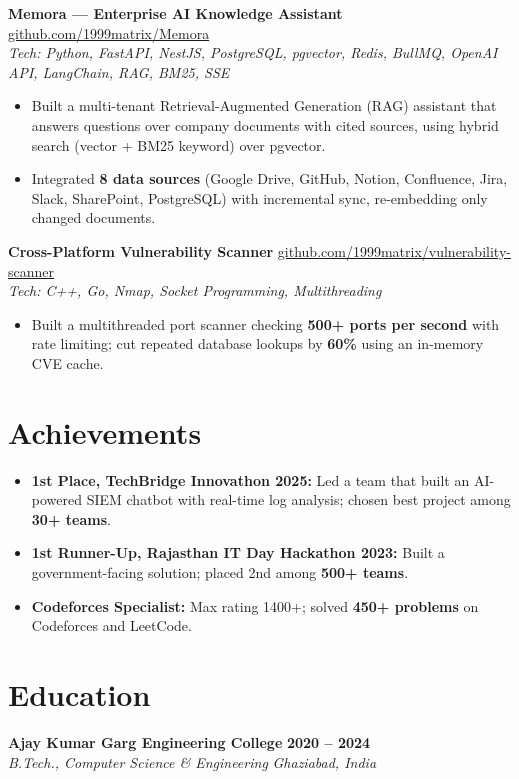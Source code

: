 \documentclass[10pt,letterpaper]{article}
\newcommand{\resumeSubheading}[4]{
    \textbf{#1} \hfill \textbf{#2}\\
    \textit{#3} \hfill \textit{#4}

}
\newcommand{\resumeProject}[3]{
    \textbf{#1} \hfill \href{https://#3}{#3} \\
    \textit{Tech: #2}

}
\newcommand{\resumeItem}[1]{
    \item #1
}
\begin{document}
\resumeProject
    {Memora --- Enterprise AI Knowledge Assistant}
    {Python, FastAPI, NestJS, PostgreSQL, pgvector, Redis, BullMQ, OpenAI API, LangChain, RAG, BM25, SSE}
    {github.com/1999matrix/Memora}

\begin{itemize}
    \resumeItem{Built a multi-tenant Retrieval-Augmented Generation (RAG) assistant that answers questions over company documents with cited sources, using hybrid search (vector + BM25 keyword) over pgvector.}

    \resumeItem{Integrated \textbf{8 data sources} (Google Drive, GitHub, Notion, Confluence, Jira, Slack, SharePoint, PostgreSQL) with incremental sync, re-embedding only changed documents.}
\end{itemize}

\vspace{1pt}

\resumeProject
    {Cross-Platform Vulnerability Scanner}
    {C++, Go, Nmap, Socket Programming, Multithreading}
    {github.com/1999matrix/vulnerability-scanner}

\begin{itemize}
    \resumeItem{Built a multithreaded port scanner checking \textbf{500+ ports per second} with rate limiting; cut repeated database lookups by \textbf{60\%} using an in-memory CVE cache.}
\end{itemize}

\section{Achievements}

\begin{itemize}
    \resumeItem{\textbf{1st Place, TechBridge Innovathon 2025:} Led a team that built an AI-powered SIEM chatbot with real-time log analysis; chosen best project among \textbf{30+ teams}.}

    \resumeItem{\textbf{1st Runner-Up, Rajasthan IT Day Hackathon 2023:} Built a government-facing solution; placed 2nd among \textbf{500+ teams}.}

    \resumeItem{\textbf{Codeforces Specialist:} Max rating 1400+; solved \textbf{450+ problems} on Codeforces and LeetCode.}
\end{itemize}

\section{Education}

\resumeSubheading
    {Ajay Kumar Garg Engineering College}
    {2020 -- 2024}
    {B.Tech., Computer Science \& Engineering}
    {Ghaziabad, India}
\end{document}
